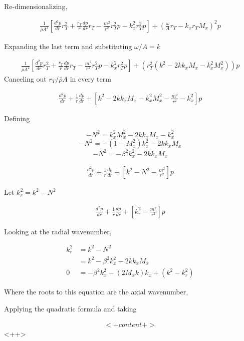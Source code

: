 \documentclass[a4paper]{report}
\begin{document}
Re-dimensionalizing,

\begin{align*}
    \frac{1}{\bar{\rho} A^2}\left[
    \frac{ d^2 p}{d r} r_T^2+
    \frac{r_T}{r} 
    \frac{d p}{d r} r_T - 
    \frac{m^2}{r^2}r_T^2 p - k_x^2r_T^2  p\right]
    + \left( \frac{\omega }{A}r_T - k_x r_T M_x \right)^2p 
\end{align*}

Expanding the last term and substituting $\omega/A = k$

\begin{align*}
    \frac{1}{\bar{\rho} A^2}\left[
    \frac{ d^2 p}{d r} r_T^2+
    \frac{r_T}{r} 
    \frac{d p}{d r} r_T - 
    \frac{m^2}{r^2}r_T^2 p - k_x^2r_T^2  p\right]
    +\left( r_T^2\left(
        k^2 - 2 k k_x M_x - k_x^2 M_x^2 \right)
    \right)p 
\end{align*}
Canceling out $r_T/\bar{\rho}A$ in every term


\begin{align*}
    \frac{ d^2 p}{d r} +
    \frac{1}{r} 
    \frac{d p}{d r} + \left[ 
    k^2 - 2 k k_x M_x - k_x^2 M_x^2- \frac{m^2}{r^2}  - k_x^2\right]p 
\end{align*}

Defining 

$$-N^2 = k_x^2 M_x^2 - 2 k k_x M_x - k_x^2 $$
$$-N^2 = -(1 -  M_x^2)k_x^2 - 2 k k_x M_x  $$
$$-N^2 = - \beta^2 k_x^2 - 2 k k_x M_x  $$


\begin{align*}
    \frac{ d^2 p}{d r} +
    \frac{1}{r} 
    \frac{d p}{d r} + \left[ 
    k^2 - N^2 - \frac{m^2}{r^2}  \right]p 
\end{align*}

Let $k_r^2 = k^2 - N^2$


\begin{align*}
    \frac{ d^2 p}{d r} +
    \frac{1}{r} 
    \frac{d p}{d r} + \left[ 
    k_r^2  - \frac{m^2}{r^2}  \right]p 
\end{align*}

Looking at the radial wavenumber,

\begin{align*}
    k_r^2 &= k^2 - N^2 \\
          &= k^2-\beta^2 k_x^2 - 2 k k_x M_x \\
    0 &= - \beta ^2 k_x ^2 - \left( 2M_x k \right)k_x +(k^2 - k_r^2)
\end{align*}

Where the roots to this equation are the axial wavenumber,


Applying the quadratic formula and taking 

\begin{align*}
    <+content+>
\end{align*}<++>


\end{document}
